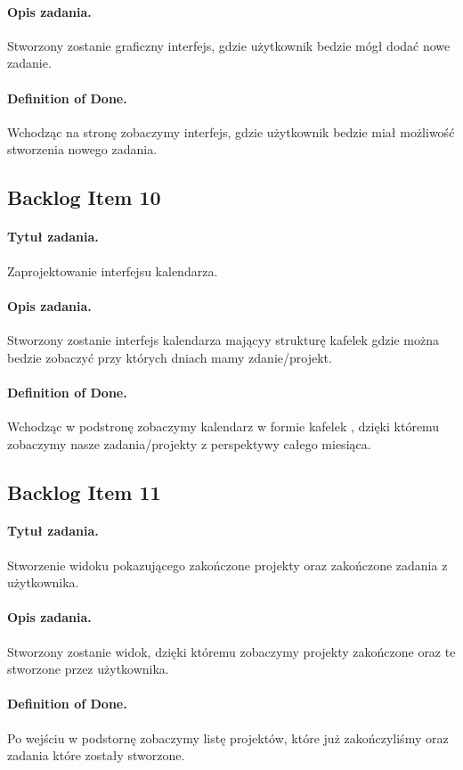 \documentclass[a4paper]{article}
\begin{document}
\paragraph{Opis zadania.} Stworzony zostanie graficzny interfejs, gdzie użytkownik bedzie mógł dodać nowe zadanie.
\paragraph{Definition of Done.} Wchodząc na stronę zobaczymy interfejs, gdzie użytkownik bedzie miał możliwość stworzenia nowego zadania.

\subsection{Backlog Item 10} 
\paragraph{Tytuł zadania.} Zaprojektowanie interfejsu kalendarza.
\paragraph{Opis zadania.} Stworzony zostanie interfejs kalendarza mającyy strukturę kafelek gdzie można bedzie zobaczyć przy których dniach mamy zdanie/projekt.
\paragraph{Definition of Done.} Wchodząc w podstronę zobaczymy kalendarz w formie kafelek , dzięki któremu zobaczymy nasze zadania/projekty z perspektywy całego miesiąca.

\subsection{Backlog Item 11} 
\paragraph{Tytuł zadania.} Stworzenie widoku pokazującego zakończone projekty oraz zakończone zadania z użytkownika.
\paragraph{Opis zadania.} Stworzony zostanie widok, dzięki któremu zobaczymy projekty zakończone oraz te stworzone przez użytkownika.
\paragraph{Definition of Done.} Po wejściu w podstornę zobaczymy listę projektów, które już zakończyliśmy oraz zadania które zostały stworzone.
\end{document}
